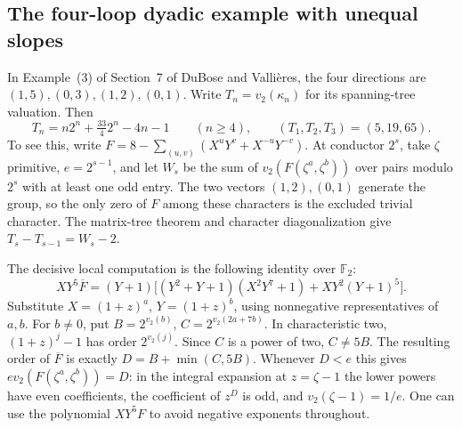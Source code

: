 \subsection{The four-loop dyadic example with unequal slopes}
In Example~(3) of Section~7 of DuBose and Valli\`eres, the four directions are $(1,5),(0,3),(1,2),(0,1)$. Write $T_n=v_2(\kappa_n)$ for its spanning-tree valuation. Then
\[
 T_n=n2^n+\tfrac{33}{4}2^n-4n-1\qquad(n\ge4),
 \qquad (T_1,T_2,T_3)=(5,19,65).
\]
To see this, write $F=8-\sum_{(u,v)}(X^uY^v+X^{-u}Y^{-v})$.
At conductor $2^s$, take $\zeta$ primitive, $e=2^{s-1}$, and let $W_s$ be the sum of $v_2(F(\zeta^a,\zeta^b))$ over pairs modulo $2^s$ with at least one odd entry. The two vectors $(1,2),(0,1)$ generate the group, so the only zero of $F$ among these characters is the excluded trivial character. The matrix-tree theorem and character diagonalization give $T_s-T_{s-1}=W_s-2$.

The decisive local computation is the following identity over $\mathbb F_2$:
\[
 XY^5\overline F=(Y+1)\big[(Y^2+Y+1)(X^2Y^7+1)+XY^2(Y+1)^5\big].
\]
Substitute $X=(1+z)^a$, $Y=(1+z)^b$, using nonnegative representatives of $a,b$. For $b\ne0$, put $B=2^{v_2(b)}$, $C=2^{v_2(2a+7b)}$. In characteristic two, $(1+z)^j-1$ has order $2^{v_2(j)}$. Since $C$ is a power of two, $C\ne5B$. The resulting order of $\overline F$ is exactly $D=B+\min(C,5B)$. Whenever $D<e$ this gives $ev_2(F(\zeta^a,\zeta^b))=D$: in the integral expansion at $z=\zeta-1$ the lower powers have even coefficients, the coefficient of $z^D$ is odd, and $v_2(\zeta-1)=1/e$. One can use the polynomial $XY^5 F$ to avoid negative exponents throughout.

